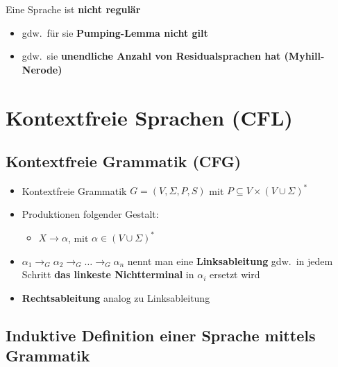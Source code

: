 \documentclass[ieeetran]{article}
\begin{document}
\pagebreak

\hspace{-0.65cm} Eine Sprache ist \textbf{nicht regulär}
\begin{itemize}
	\item gdw.\ für sie \textbf{Pumping-Lemma nicht gilt}
	\item gdw.\ sie \textbf{unendliche Anzahl von Residualsprachen hat (Myhill-Nerode)}
\end{itemize}
\section{Kontextfreie Sprachen (CFL)} %
\label{sec:kontextfreie_sprachen}

\subsection{Kontextfreie Grammatik (CFG)} %
\label{sub:kontextfreie_grammatik_cFG}
\begin{itemize}
	\item Kontextfreie Grammatik $G = (V, \Sigma, P, S)$ mit $P \subseteq V \times (V \cup \Sigma)^*$
  \item Produktionen folgender Gestalt:
\begin{itemize}
  \item $X \rightarrow \alpha$, mit $\alpha \in (V \cup \Sigma)^*$
\end{itemize}

\item $\alpha_1 \rightarrow_G \alpha_2 \rightarrow_G \ldots \rightarrow_G \alpha_n$ nennt man eine \textbf{Linksableitung} gdw.\ in jedem Schritt \textbf{das linkeste Nichtterminal} in $\alpha_i$ ersetzt wird
\item \textbf{Rechtsableitung} analog zu Linksableitung
\end{itemize}

\subsection{Induktive  Definition einer Sprache mittels Grammatik} %
\label{sub:induktive_definition}
\end{document}
